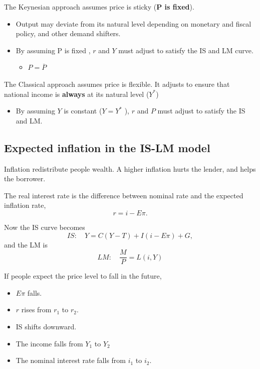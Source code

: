 \documentclass[10pt]{article}
\begin{document}
The Keynesian approach assumes price is sticky ({\textbf {P is fixed}}).
\begin{itemize}
\item Output may deviate from its natural level depending on monetary and fiscal policy,
		and other demand shifters.
\item By assuming P is fixed , $ r $ and $ Y $ must adjust to satisfy the IS and LM curve.
		\begin{itemize}
		\item $ P =  \overline{P} $
		\end{itemize}
\end{itemize}




The Classical approach assumes price is flexible. It adjusts to ensure that national
income is {\textbf {always}} at its natural level ($ Y^{*} $)
\begin{itemize}
		\item By assuming $ Y $ is constant ($ Y = Y^{*} $ ), $ r $ and $ P $ must adjust
				to satisfy the IS and LM.
\end{itemize}








\subsection{Expected inflation in the IS-LM model}
Inflation redistribute people wealth. A higher inflation hurts the lender,
and helps the borrower.

The real interest rate is the difference between nominal rate and the expected inflation
rate,
\begin{equation*}
r = i - E \pi.
\end{equation*}

Now the IS curve becomes
\begin{equation*}
IS: \quad Y = C(Y - T) + I(i - E \pi) + G,
\end{equation*}
and the LM is 
\begin{equation*}
LM: \quad \frac{M}{P} = L(i, Y)
\end{equation*}




If people expect the price level to fall in the future, 
\begin{itemize}
\item $ E \pi $ falls.
\item $ r $ rises from $ r_1 $ to $ r_2 $.
\item IS shifts downward.
\item The income falls from $ Y_1 $ to $ Y_2 $
\item The nominal interest rate falls from $ i_1 $ to $ i_2 $.
\end{itemize}
\end{document}
